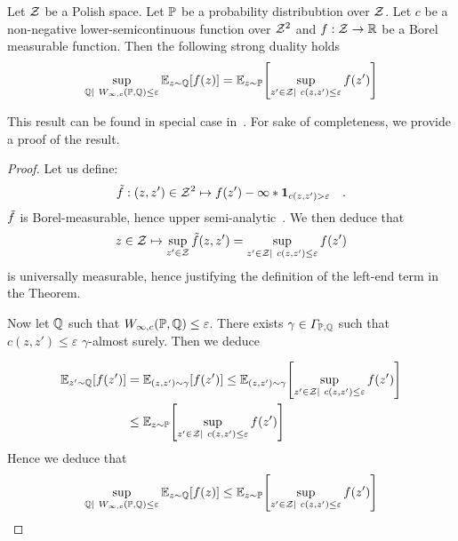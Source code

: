 \begin{thm}
Let $\mathcal{Z}$ be a Polish space. Let $\mathbb{P}$ be a probability distribubtion over $\mathcal{Z}$. Let $c$ be a non-negative lower-semicontinuous function over $\mathcal{Z}^2$ and $f:\mathcal{Z}\to \mathbb{R}$ be a Borel measurable function. Then the following strong duality holds
    \begin{align*}
        \sup_{\QQ|~W_{\infty,c}(\PP,\QQ)\leq \varepsilon}\mathbb{E}_{z\sim\QQ}\left[f(z)\right] = \mathbb{E}_{z\sim\PP}\left[\sup_{z'\in \ZZ|~c(z,z')\leq\varepsilon} f(z')\right]
    \end{align*}  
\end{thm}
This result can be found in special case in~\citep{xxx}. For sake of completeness, we provide a proof of the result. 
\begin{proof}
     Let us define:
     \begin{align*}
        \Tilde{f}:(z,z')\in\mathcal{Z}^2\mapsto f(z')-\infty*\mathbf{1}_{c(z,z')>\varepsilon}\quad. 
     \end{align*}
     $\Tilde{f}$ is Borel-measurable, hence upper semi-analytic~\citep[Chapter 7]{bertsekas2004stochastic}. We then deduce that 
     \begin{align*}
       z\in\mathcal{Z}\mapsto \sup_{z'\in\mathcal{Z}} \Tilde{f}(z,z') = \sup_{z'\in \mathcal{Z}|~c(z,z')\leq\varepsilon} f(z')
     \end{align*}
     is universally measurable, hence justifying the definition of the left-end term in the Theorem. 

     Now let $\mathbb{Q}$ such that $W_{\infty,c}(\mathbb{P},\mathbb{Q})\leq \varepsilon$. There exists $\gamma\in\Gamma_{\mathbb{P},\mathbb{Q}}$ such that $c(z,z')\leq \varepsilon$ $\gamma$-almost surely. Then we deduce

     \begin{align*}
        \mathbb{E}_{z'\sim\QQ}\left[f(z')\right] &= \mathbb{E}_{(z,z')\sim\gamma}\left[f(z')\right]\leq\mathbb{E}_{(z,z')\sim\gamma}\left[\sup_{z'\in \ZZ|~c(z,z')\leq\varepsilon} f(z')\right] \\
       & \leq\mathbb{E}_{z\sim \PP}\left[\sup_{z'\in \ZZ|~c(z,z')\leq\varepsilon} f(z')\right]
      \end{align*}
      Hence we deduce that 
      \begin{align*}
        \sup_{\QQ|~W_{\infty,c}(\PP,\QQ)\leq \varepsilon}\mathbb{E}_{z\sim\QQ}\left[f(z)\right] \leq\mathbb{E}_{z\sim\PP}\left[\sup_{z'\in \ZZ|~c(z,z')\leq\varepsilon} f(z')\right]
      \end{align*}
     

\end{proof}
